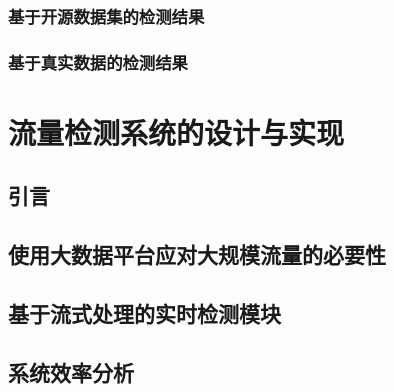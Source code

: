 \subsection{基于开源数据集的检测结果}

\subsection{基于真实数据的检测结果}

\chapter{流量检测系统的设计与实现}

\section{引言}

\section{使用大数据平台应对大规模流量的必要性}

\section{基于流式处理的实时检测模块}

\section{系统效率分析}
